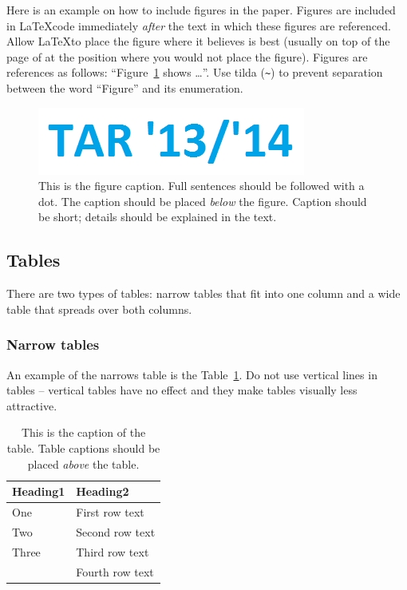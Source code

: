 \documentclass[10pt, a4paper]{article}
\begin{document}
Here is an example on how to include figures in the paper. Figures are included in \LaTeX code immediately \textit{after} the text in which these figures are referenced. Allow \LaTeX to place the figure where it believes is best (usually on top of the page of at the position where you would not place the figure). Figures are references as follows: ``Figure~\ref{fig:figure1} shows \dots''. Use tilda (\verb.~.) to prevent separation between the word ``Figure'' and its enumeration. 

\begin{figure}
\begin{center}
\includegraphics[width=\columnwidth]{tar1314}
\caption{This is the figure caption. Full sentences should be followed with a dot. The caption should be placed \textit{below} the figure. Caption should be short; details should be explained in the text.}
\label{fig:figure1}
\end{center}
\end{figure}

\subsection{Tables}

There are two types of tables: narrow tables that fit into one column and a wide table that spreads over both columns.

\subsubsection{Narrow tables}

An example of the narrows table is the Table~\ref{tab:narrow-table}. Do not use vertical lines in tables -- vertical tables have no effect and they make tables visually less attractive.

\begin{table}
\caption{This is the caption of the table. Table captions should be placed \textit{above} the table.}
\label{tab:narrow-table}
\begin{center}
\begin{tabular}{ll}
\toprule
Heading1 & Heading2 \\
\midrule
One & First row text \\
Two   & Second row text \\
Three   & Third row text \\
      & Fourth row text \\
\bottomrule
\end{tabular}
\end{center}
\end{table}
\end{document}
